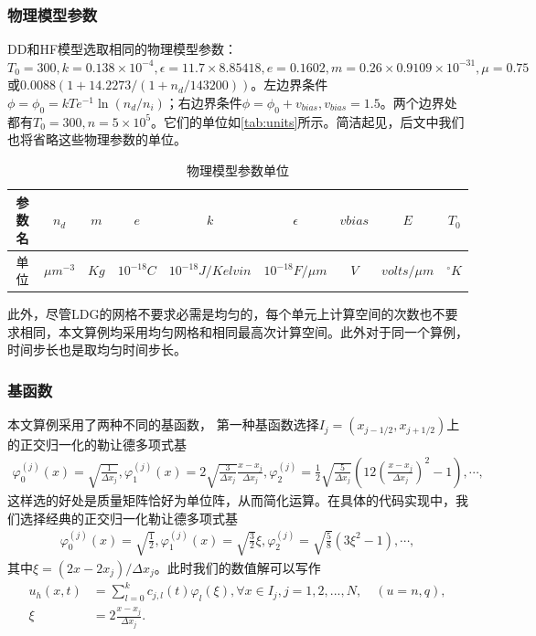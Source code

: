 \subsubsection{物理模型参数}
DD和HF模型选取相同的物理模型参数：$T_0 = 300, k = 0.138 \times 10^{-4}, \epsilon = 11.7\times 8.85418, e = 0.1602, m = 0.26\times0.9109\times 10^{-31}, \mu = 0.75 $或$0.0088(1+14.2273/(1+n_d/143200))$。左边界条件$\phi=\phi_0=kTe^{-1}\ln(n_d/n_i)$；右边界条件$\phi = \phi_0+v_{bias}, v_{bias}=1.5$。两个边界处都有$T_0 = 300, n = 5\times 10^5$。它们的单位如\autoref{tab:units}所示\cite{cercignani2000deviceb}。简洁起见，后文中我们也将省略这些物理参数的单位。
\begin{table}[htbp]
    \centering
    \begin{tabular}{ccccccccc}
        \hline
        参数名 & $n_d$        & $m$  & $e$         & $k$                & $\epsilon$        & $vbias$ & $E$           & $T_0$      \\
        \hline
        单位   & $\mu m^{-3}$ & $Kg$ & $10^{-18}C$ & $10^{-18}J/Kelvin$ & $10^{-18}F/\mu m$ & $V$     & $volts/\mu m$ & $^\circ K$ \\
        \hline
    \end{tabular}
    \caption{物理模型参数单位}
    \label{tab:units}
\end{table}

此外，尽管LDG的网格不要求必需是均匀的，每个单元上计算空间的次数也不要求相同，本文算例均采用均匀网格和相同最高次计算空间。此外对于同一个算例，时间步长也是取均匀时间步长。
\subsubsection{基函数}
本文算例采用了两种不同的基函数，
第一种基函数选择$I_j = (x_{j-1/2}, x_{j+1/2})$上的正交归一化的勒让德多项式基
\begin{align*}
    \varphi_0^{(j)}(x) = \sqrt{\frac{1}{\Delta x_j}}, \varphi_1^{(j)}(x) = 2\sqrt{\frac{3}{\Delta x_j}}\frac{x-x_j}{\Delta x_j}, \varphi_2^{(j)} =\frac{1}{2}\sqrt{\frac{5}{\Delta x_j}}(12(\frac{x-x_j}{\Delta x_j})^2 - 1 ), \cdots,
\end{align*}
这样选的好处是质量矩阵恰好为单位阵，从而简化运算。在具体的代码实现中，我们选择经典的正交归一化勒让德多项式基
\begin{align*}
    \varphi_0^{(j)}(x) = \sqrt{\frac{1}{2}}, \varphi_1^{(j)}(x) = \sqrt{\frac{3}{2}}\xi, \varphi_2^{(j)} =\sqrt{\frac{5}{8}}(3\xi^2- 1 ), \cdots,
\end{align*}
其中$\xi = (2x-2x_j)/\Delta x_j$。此时我们的数值解可以写作
\begin{align*}
    u_h(x,t) & = \sum_{l=0}^k c_{j,l}(t)\varphi_{l}(\xi), \forall x \in I_j , j= 1,2,...,N, \quad (u = n,q), \\
    \xi      & = 2\frac{x-x_j}{\Delta x_j}.
\end{align*}

